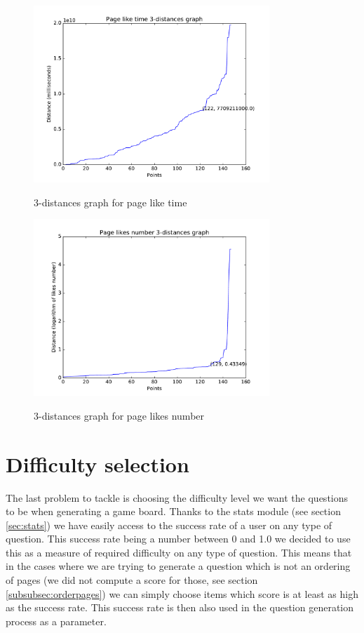 \begin{figure}
\centering
{\includegraphics[width=3.5in]{images/page_like_time_knn.pdf}}
\caption{3-distances graph for page like time}
\label{fig:plikeTime}
\end{figure}
\begin{figure}
\centering
{\includegraphics[width=3.5in]{images/page_likes_number_knn.pdf}}
\caption{3-distances graph for page likes number}
\label{fig:plikesNumber}
\end{figure}

\section{Difficulty selection}
The last problem to tackle is choosing the difficulty level we want the questions to be when generating a game board. Thanks to the stats module (see section \ref{sec:stats}) we have easily access to the success rate of a user on any type of question. This success rate being a number between 0 and 1.0 we decided to use this as a measure of required difficulty on any type of question. This means that in the cases where we are trying to generate a question which is not an ordering of pages (we did not compute a score for those, see section \ref{subsubsec:orderpages}) we can simply choose items which score is at least as high as the success rate. This success rate is then also used in the question generation process as a parameter.